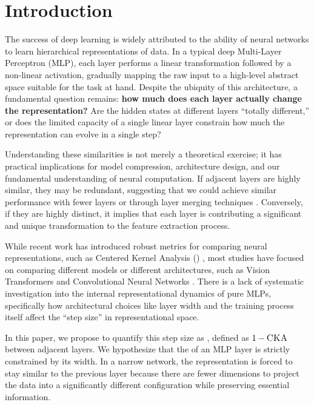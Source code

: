 \section{Introduction}
\label{sec:intro}

The success of deep learning is widely attributed to the ability of neural networks to learn hierarchical representations of data. In a typical deep Multi-Layer Perceptron (MLP), each layer performs a linear transformation followed by a non-linear activation, gradually mapping the raw input to a high-level abstract space suitable for the task at hand. Despite the ubiquity of this architecture, a fundamental question remains: {\bf how much does each layer actually change the representation?} Are the hidden states at different layers ``totally different,'' or does the limited capacity of a single linear layer constrain how much the representation can evolve in a single step?

Understanding these similarities is not merely a theoretical exercise; it has practical implications for model compression, architecture design, and our fundamental understanding of neural computation. If adjacent layers are highly similar, they may be redundant, suggesting that we could achieve similar performance with fewer layers or through layer merging techniques \cite{yang2024laco}. Conversely, if they are highly distinct, it implies that each layer is contributing a significant and unique transformation to the feature extraction process.

While recent work has introduced robust metrics for comparing neural representations, such as Centered Kernel Analysis (\cka) \cite{kornblith2019similarity}, most studies have focused on comparing different models or different architectures, such as Vision Transformers and Convolutional Neural Networks \cite{raghu2021vision}. There is a lack of systematic investigation into the internal representational dynamics of pure MLPs, specifically how architectural choices like layer width and the training process itself affect the ``step size'' in representational space.

In this paper, we propose to quantify this step size as \repdiv, defined as $1 - \text{\textsc{CKA}}$ between adjacent layers. We hypothesize that the \transcap of an MLP layer is strictly constrained by its width. In a narrow network, the representation is forced to stay similar to the previous layer because there are fewer dimensions to project the data into a significantly different configuration while preserving essential information.

